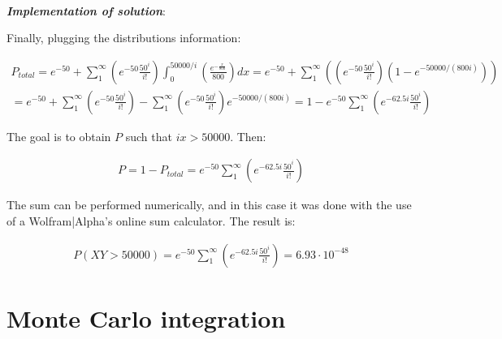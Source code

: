 \documentclass[paper=a4, fontsize=11pt]{scrartcl} %
\numberwithin{equation}{section} %
\numberwithin{figure}{section} %
\numberwithin{table}{section} %
\begin{document}
\ \\
\textit{\textbf{Implementation of solution}}:

Finally, plugging the distributions information:

\begin{equation}
\begin{split}
P_{total} = e^{-50}+\sum_{1}^{\infty} \left( e^{-50}\frac{50^{i}}{i!} \right) \int_{0}^{50000/i}\left( \frac{e^{-\frac{x}{800}}}{800} \right)dx = e^{-50}+\sum_{1}^{\infty} \left( \left( e^{-50}\frac{50^{i}}{i!} \right) \left( 1 - e^{-50000/(800i)} \right) \right) \\
= e^{-50}+\sum_{1}^{\infty} \left( e^{-50}\frac{50^{i}}{i!} \right) - \sum_{1}^{\infty} \left( e^{-50}\frac{50^{i}}{i!} \right) e^{-50000/(800i)}  = 1 - e^{-50}\sum_{1}^{\infty} \left( e^{-62.5i}\frac{50^{i}}{i!} \right)
\end{split}
\label{eq:total_prob4}
\end{equation}


The goal is to obtain $P$ such that $ix>50000$. Then:

\begin{equation}
\begin{split}
P = 1 - P_{total}  = e^{-50}\sum_{1}^{\infty} \left( e^{-62.5i}\frac{50^{i}}{i!} \right)
\end{split}
\label{eq:total_prob4}
\end{equation}

The sum can be performed numerically, and in this case it was done with the use of a Wolfram|Alpha's online sum calculator. The result is:


\begin{equation}
\begin{split}
P (XY>50000) = e^{-50}\sum_{1}^{\infty} \left( e^{-62.5i}\frac{50^{i}}{i!} \right) = 6.93\cdot 10^{-48}
\end{split}
\label{eq:total_prob4}
\end{equation}




\section{Monte Carlo integration}
\end{document}
